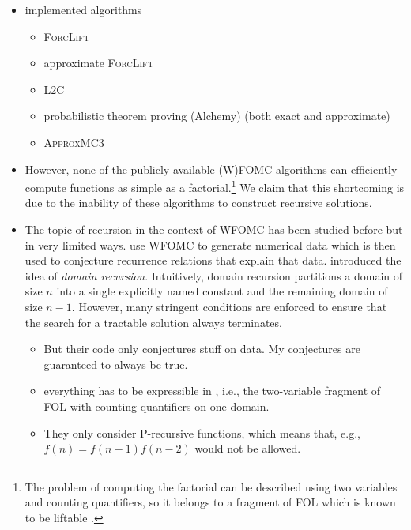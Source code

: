 \begin{itemize}
\begin{itemize}
                \citep{DBLP:conf/kr/BremenK21}
        \end{itemize}
  \item implemented algorithms
        \begin{itemize}
          \item \textsc{ForcLift} \citep{DBLP:conf/ijcai/BroeckTMDR11}
          \item approximate \textsc{ForcLift} \citep{DBLP:conf/uai/BroeckCD12}
          \item \textsc{L2C} \citep{DBLP:conf/kr/KazemiP16}
          \item probabilistic theorem proving (Alchemy) (both exact and
                approximate) \citep{DBLP:journals/cacm/GogateD16}
          \item \textsc{ApproxMC3} \citep{DBLP:conf/ijcai/BremenK20}
        \end{itemize}
  \item However, none of the publicly available (W)FOMC algorithms can
        efficiently compute functions as simple as a factorial.\footnote{The
        problem of computing the factorial can be described using two variables
        and counting quantifiers, so it belongs to a fragment of FOL which is
        known to be liftable \citep{DBLP:journals/jair/Kuzelka21}.} We claim
        that this shortcoming is due to the inability of these algorithms to
        construct recursive solutions.
  \item The topic of recursion in the context of WFOMC has been studied before
        but in very limited ways.  use WFOMC
        to generate numerical data which is then used to conjecture recurrence
        relations that explain that data. 
        introduced the idea of \emph{domain recursion}. Intuitively, domain
        recursion partitions a domain of size $n$ into a single explicitly named
        constant and the remaining domain of size $n-1$. However, many stringent
        conditions are enforced to ensure that the search for a tractable
        solution always terminates.
        \begin{itemize}
          \item But their code only conjectures stuff on data. My conjectures
                are guaranteed to always be true.
          \item everything has to be expressible in \Ctwo{}, i.e., the
                two-variable fragment of FOL with counting quantifiers on one
                domain.
          \item They only consider P-recursive functions, which means that,
                e.g., $f(n) = f(n-1)f(n-2)$ would not be allowed.
        \end{itemize}
\end{itemize}

